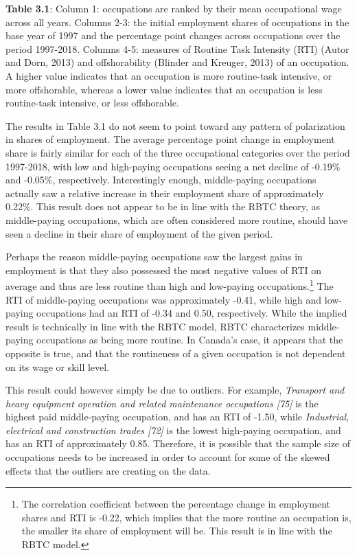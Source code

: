 \documentclass[undefended]{bumrp}
\begin{document}
\newpage

\begin{flushleft}
\textbf{Table 3.1}: Column 1: occupations are ranked by their mean occupational wage across all years. Columns 2-3: the initial employment shares of occupations in the base year of 1997 and the percentage point changes across occupations over the period 1997-2018. Columns 4-5: measures of Routine Task Intensity (RTI) (Autor and Dorn, 2013) and offshorability (Blinder and Kreuger, 2013) of an occupation. A higher value indicates that an occupation is more routine-task intensive, or more offshorable, whereas a lower value indicates that an occupation is less routine-task intensive, or less offshorable. 
\end{flushleft}

The results in Table 3.1 do not seem to point toward any pattern of polarization in shares of employment. The average percentage point change in employment share is fairly similar for each of the three occupational categories over the period 1997-2018, with low and high-paying occupations seeing a net decline of -0.19\% and -0.05\%, respectively. Interestingly enough, middle-paying occupations actually saw a relative increase in their employment share of approximately 0.22\%.  This result does not appear to be in line with the RBTC theory, as middle-paying occupations, which are often considered more routine, should have seen a decline in their share of employment of the given period. 

Perhaps the reason middle-paying occupations saw the largest gains in employment is that they also possessed the most negative values of RTI on average and thus are less routine than high and low-paying occupations.\footnote{The correlation coefficient between the percentage change in employment shares and RTI is -0.22, which implies that the more routine an occupation is, the smaller its share of employment will be. This result is in line with the RBTC model.} The RTI of middle-paying occupations was approximately -0.41, while high and low-paying occupations had an RTI of  -0.34 and 0.50, respectively.  While the implied result is technically in line with the RBTC model, RBTC characterizes middle-paying occupations as being more routine. In Canada's case, it appears that the opposite is true, and that the routineness of a given occupation is not dependent on its wage or skill level.

This result could however simply be due to outliers. For example, \textit{Transport and heavy equipment operation and related maintenance occupations [75]} is the highest paid middle-paying occupation, and has an RTI of -1.50, while \textit{Industrial, electrical and construction trades [72]} is the lowest high-paying occupation, and has an RTI of approximately 0.85. Therefore, it is possible that the sample size of occupations needs to be increased in order to account for some of the skewed effects that the outliers are creating on the data.
\end{document}
